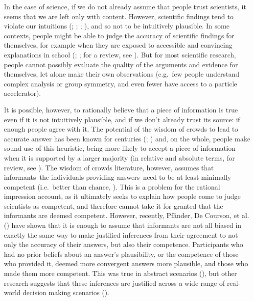 \documentclass[
  jou,
  floatsintext,
  longtable,
  nolmodern,
  notxfonts,
  notimes,
  colorlinks=true,linkcolor=blue,citecolor=blue,urlcolor=blue]{apa7}
\begin{document}
In the case of science, if we do not already assume that people trust
scientists, it seems that we are left only with content. However,
scientific findings tend to violate our intuitions
(;
;
;
), and so
not to be intuitively plausible. In some contexts, people might be able
to judge the accuracy of scientific findings for themselves, for example
when they are exposed to accessible and convincing explanations in
school (; ; for a review, see
). But for most scientific research, people cannot possibly
evaluate the quality of the arguments and evidence for themselves, let
alone make their own observations (e.g.~few people understand complex
analysis or group symmetry, and even fewer have access to a particle
accelerator).

It is possible, however, to rationally believe that a piece of
information is true even if it is not intuitively plausible, and if we
don't already trust its source: if enough people agree with it. The
potential of the wisdom of crowds to lead to accurate answer has been
known for centuries
(;
)
and, on the whole, people make sound use of this heuristic, being more
likely to accept a piece of information when it is supported by a larger
majority (in relative and absolute terms, for review, see
). The
wisdom of crowds literature, however, assumes that informants--the
individuals providing answers--need to be at least minimally competent
(i.e.~better than chance,
).
This is a problem for the rational impression account, as it ultimately
seeks to explain how people come to judge scientists as competent, and
therefore cannot take it for granted that the informants are deemed
competent. However, recently, Pfänder, De Courson, et al.
() have shown that it is
enough to assume that informants are not all biased in exactly the same
way to make justified inferences from their agreement to not only the
accuracy of their answers, but also their competence. Participants who
had no prior beliefs about an answer's plausibility, or the competence
of those who provided it, deemed more convergent answers more plausible,
and those who made them more competent. This was true in abstract
scenarios (), but other research suggests that these inferences are
justified across a wide range of real-world decision making scenarios
().
\end{document}

